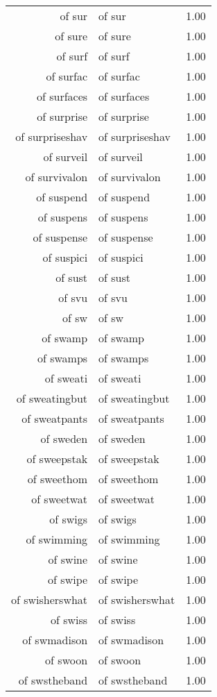 \begin{table}[ht]
\begin{tabular}{rlr}
  of sur & of sur & 1.00 \\ 
  of sure & of sure & 1.00 \\ 
  of surf & of surf & 1.00 \\ 
  of surfac & of surfac & 1.00 \\ 
  of surfaces & of surfaces & 1.00 \\ 
  of surprise & of surprise & 1.00 \\ 
  of surpriseshav & of surpriseshav & 1.00 \\ 
  of surveil & of surveil & 1.00 \\ 
  of survivalon & of survivalon & 1.00 \\ 
  of suspend & of suspend & 1.00 \\ 
  of suspens & of suspens & 1.00 \\ 
  of suspense & of suspense & 1.00 \\ 
  of suspici & of suspici & 1.00 \\ 
  of sust & of sust & 1.00 \\ 
  of svu & of svu & 1.00 \\ 
  of sw & of sw & 1.00 \\ 
  of swamp & of swamp & 1.00 \\ 
  of swamps & of swamps & 1.00 \\ 
  of sweati & of sweati & 1.00 \\ 
  of sweatingbut & of sweatingbut & 1.00 \\ 
  of sweatpants & of sweatpants & 1.00 \\ 
  of sweden & of sweden & 1.00 \\ 
  of sweepstak & of sweepstak & 1.00 \\ 
  of sweethom & of sweethom & 1.00 \\ 
  of sweetwat & of sweetwat & 1.00 \\ 
  of swigs & of swigs & 1.00 \\ 
  of swimming & of swimming & 1.00 \\ 
  of swine & of swine & 1.00 \\ 
  of swipe & of swipe & 1.00 \\ 
  of swisherswhat & of swisherswhat & 1.00 \\ 
  of swiss & of swiss & 1.00 \\ 
  of swmadison & of swmadison & 1.00 \\ 
  of swoon & of swoon & 1.00 \\ 
  of swstheband & of swstheband & 1.00 \\ 

\end{tabular}
\end{table}
